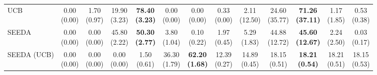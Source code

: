 \begin{table}[H]
{\begin{tabular}{l|cccccc|cccccc}
UCB & \makecell{0.00 \\ (0.00)} & \makecell{1.70 \\ (0.97)} & {\cellcolor[HTML]{C8E6C9}} \makecell{19.90 \\ (3.23)} & \bfseries \makecell{78.40 \\ (3.23)} & \makecell{0.00 \\ (0.00)} & \makecell{0.00 \\ (0.00)} & \makecell{0.33 \\ (0.00)} & \makecell{2.11 \\ (12.50)} & {\cellcolor[HTML]{C8E6C9}} \makecell{24.60 \\ (35.77)} & \bfseries \makecell{71.26 \\ (37.11)} & \makecell{1.17 \\ (1.85)} & \makecell{0.53 \\ (0.38)} \\
SEEDA & \makecell{0.00 \\ (0.00)} & \makecell{0.00 \\ (0.00)} & {\cellcolor[HTML]{C8E6C9}} \makecell{45.80 \\ (2.22)} & \bfseries \makecell{50.30 \\ (2.77)} & \makecell{3.80 \\ (1.04)} & \makecell{0.10 \\ (0.22)} & \makecell{1.97 \\ (0.45)} & \makecell{5.29 \\ (1.83)} & {\cellcolor[HTML]{C8E6C9}} \makecell{44.88 \\ (12.72)} & \bfseries \makecell{45.60 \\ (12.67)} & \makecell{2.24 \\ (2.50)} & \makecell{0.03 \\ (0.17)} \\
SEEDA (UCB) & \makecell{0.00 \\ (0.00)} & \makecell{0.00 \\ (0.00)} & {\cellcolor[HTML]{C8E6C9}} \makecell{0.00 \\ (0.00)} & \makecell{1.50 \\ (0.61)} & \makecell{36.30 \\ (1.79)} & \bfseries \makecell{62.20 \\ (1.68)} & \makecell{12.39 \\ (0.27)} & \makecell{14.89 \\ (0.45)} & {\cellcolor[HTML]{C8E6C9}} \makecell{18.15 \\ (0.51)} & \bfseries \makecell{18.21 \\ (0.54)} & \makecell{18.21 \\ (0.51)} & \makecell{18.15 \\ (0.53)} \\

\end{tabular}}
\end{table}
